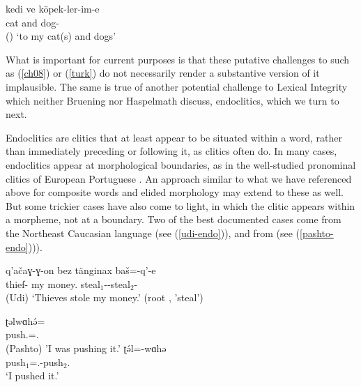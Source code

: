 \documentclass[output=paper,biblatex,babelshorthands,newtxmath,draftmode,colorlinks,citecolor=brown]{langscibook}
\begin{document}
\ea
\label{turk}
\gll kedi ve köpek-ler-im-e \\
     cat and dog- \\\hfill()
\glt `to my cat(s) and dogs'	
\z

What is important for current purposes is that these putative challenges to  such as (\ref{ch08}) or (\ref{turk}) do not necessarily render a substantive version of it implausible. The same is true of another potential challenge to Lexical Integrity which neither Bruening nor Haspelmath discuss, endoclitics, which we turn to next.

Endoclitics are clitics that at least appear to be situated within a word, rather than immediately
preceding or following it, as clitics often do.
In many cases, endoclitics appear at morphological boundaries, as in the well-studied pronominal clitics of European Portuguese \citep{Crysmann2000a}. An approach similar to what we have referenced above for composite words and elided morphology may extend to these as well. But some trickier cases have also come to light, in which the clitic appears within a morpheme, not at a boundary. Two of the best documented cases come from the Northeast Caucasian language  \citep{Harris2000} (see (\ref{udi-endo})), and from  \citep{Tegey1977,Roberts2000,Dost2007} (see (\ref{pashto-endo}))).

\ea
\label{udi-endo}
\gll q'a\v{c}aɣ-ɣ-on bez t\"{a}nginax ba\v{s}=-q'-e\footnotemark\\
     thief- my money. steal$_{1}$--steal$_{2}$- \\\hfill(Udi)
\glt `Thieves stole my money.' (root , 'steal') 
\z

\eal
\label{pashto-endo}
\ex\label{pashto-endo-a}
\gll ʈəlwɑhə́=\footnotemark \\
     push.=. \\\hfill(Pashto)
\glt 'I was pushing it.'
\ex\label{pashto-endo-b}
\gll ʈə́l=-wɑhə\footnotemark \\
     push$_{1}$=.-push$_{2}$. \\
\glt `I pushed it.'
\zl
\end{document}
